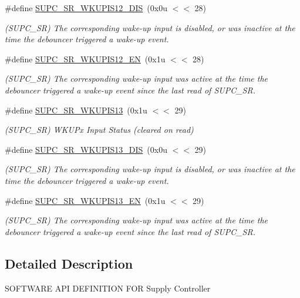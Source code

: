 \begin{DoxyCompactItemize}
\#define \mbox{\hyperlink{group__SAME70__SUPC_ga8d50ae6062fac5694ae093e8dfc63894}{S\+U\+P\+C\+\_\+\+S\+R\+\_\+\+W\+K\+U\+P\+I\+S12\+\_\+\+D\+IS}}~(0x0u $<$$<$ 28)
\begin{DoxyCompactList}\small\item\em (S\+U\+P\+C\+\_\+\+SR) The corresponding wake-\/up input is disabled, or was inactive at the time the debouncer triggered a wake-\/up event. \end{DoxyCompactList}\item 
\mbox{\label{group__SAME70__SUPC_ga88926dd1474bacfe6d4f9d31a5ecd487}} 
\#define \mbox{\hyperlink{group__SAME70__SUPC_ga88926dd1474bacfe6d4f9d31a5ecd487}{S\+U\+P\+C\+\_\+\+S\+R\+\_\+\+W\+K\+U\+P\+I\+S12\+\_\+\+EN}}~(0x1u $<$$<$ 28)
\begin{DoxyCompactList}\small\item\em (S\+U\+P\+C\+\_\+\+SR) The corresponding wake-\/up input was active at the time the debouncer triggered a wake-\/up event since the last read of S\+U\+P\+C\+\_\+\+SR. \end{DoxyCompactList}\item 
\mbox{\label{group__SAME70__SUPC_gac72338e58315c3ef88f7a9328533328e}} 
\#define \mbox{\hyperlink{group__SAME70__SUPC_gac72338e58315c3ef88f7a9328533328e}{S\+U\+P\+C\+\_\+\+S\+R\+\_\+\+W\+K\+U\+P\+I\+S13}}~(0x1u $<$$<$ 29)
\begin{DoxyCompactList}\small\item\em (S\+U\+P\+C\+\_\+\+SR) W\+K\+U\+Px Input Status (cleared on read) \end{DoxyCompactList}\item 
\mbox{\label{group__SAME70__SUPC_gaba99fb2dc63dc1fcd2c4a421437a0fbc}} 
\#define \mbox{\hyperlink{group__SAME70__SUPC_gaba99fb2dc63dc1fcd2c4a421437a0fbc}{S\+U\+P\+C\+\_\+\+S\+R\+\_\+\+W\+K\+U\+P\+I\+S13\+\_\+\+D\+IS}}~(0x0u $<$$<$ 29)
\begin{DoxyCompactList}\small\item\em (S\+U\+P\+C\+\_\+\+SR) The corresponding wake-\/up input is disabled, or was inactive at the time the debouncer triggered a wake-\/up event. \end{DoxyCompactList}\item 
\mbox{\label{group__SAME70__SUPC_gaec34ff09f82b720754bd86d17b184972}} 
\#define \mbox{\hyperlink{group__SAME70__SUPC_gaec34ff09f82b720754bd86d17b184972}{S\+U\+P\+C\+\_\+\+S\+R\+\_\+\+W\+K\+U\+P\+I\+S13\+\_\+\+EN}}~(0x1u $<$$<$ 29)
\begin{DoxyCompactList}\small\item\em (S\+U\+P\+C\+\_\+\+SR) The corresponding wake-\/up input was active at the time the debouncer triggered a wake-\/up event since the last read of S\+U\+P\+C\+\_\+\+SR. \end{DoxyCompactList}\end{DoxyCompactItemize}


\subsection{Detailed Description}
S\+O\+F\+T\+W\+A\+RE A\+PI D\+E\+F\+I\+N\+I\+T\+I\+ON F\+OR Supply Controller 